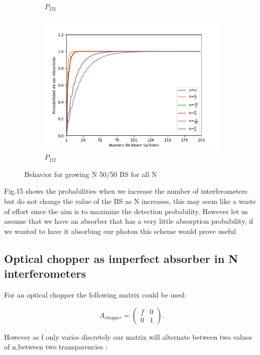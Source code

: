 \documentclass[12pt]{book}
\begin{document}
\begin{figure}[!htb]
\begin{subfigure}[b]{0.45\linewidth}
\caption{$P_{D2}$}
\label{fig:westminster_aerea}
\end{subfigure}
\begin{subfigure}[b]{0.45\linewidth}
\includegraphics[width=\linewidth]{images/BsFijo_azumaabs.png}
\caption{$P_{D2}$}
\label{fig:BS1}
\end{subfigure}
\caption{Behavior for growing N 50/50 BS for all N}
\label{fig:westminster}
\end{figure} 
 
 Fig.15 shows the probabilities when we increase the number of interferometers but do not change the value of the BS as N increases, this may seem like a waste of effort since the aim is to maximize the detection probability. However let us assume that we have an absorber that has a very little absorption probability, if we wanted to have it absorbing our photon this scheme would prove useful

\subsection{Optical chopper as imperfect absorber in N interferometers}
For an optical chopper the following matrix could be used:

\begin{equation}
A_{chopper}=\begin{pmatrix} f & 0 \\ 0 & 1 \end{pmatrix}.
\end{equation}

However as f only varies discretely our matrix will alternate between two values of n,between two transparencies :
\end{document}
